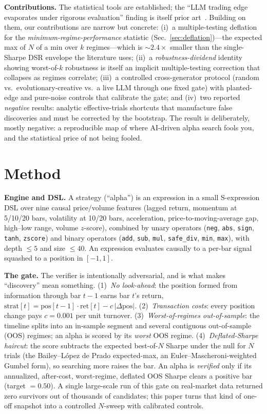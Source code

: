 \documentclass[sigconf,review,anonymous]{acmart}
\begin{document}
\textbf{Contributions.} The statistical tools are established; the ``LLM trading edge evaporates under rigorous evaluation'' finding is itself prior art~\cite{finsaber2026}. Building on them, our contributions are narrow but concrete: (i)~a multiple-testing deflation for the \emph{minimum-regime-performance} statistic (Sec.~\ref{sec:deflation})---the expected max of $N$ of a min over $k$ regimes---which is ${\sim}2.4\times$ smaller than the single-Sharpe DSR envelope the literature uses; (ii)~a \emph{robustness-dividend} identity showing worst-of-$k$ robustness is itself an implicit multiple-testing correction that collapses as regimes correlate; (iii)~a controlled cross-generator protocol (random vs.\ evolutionary-creative vs.\ a live LLM through one fixed gate) with planted-edge and pure-noise controls that calibrate the gate; and (iv)~two reported \emph{negative} results: analytic effective-trials shortcuts that manufacture false discoveries and must be corrected by the bootstrap. The result is deliberately, mostly negative: a reproducible map of where AI-driven alpha search fools you, and the statistical price of not being fooled.

\section{Method}
\textbf{Engine and DSL.} A strategy (``alpha'') is an expression in a small S-expression DSL over nine causal price/volume features (lagged return, momentum at 5/10/20 bars, volatility at 10/20 bars, acceleration, price-to-moving-average gap, high--low range, volume $z$-score), combined by unary operators (\texttt{neg}, \texttt{abs}, \texttt{sign}, \texttt{tanh}, \texttt{zscore}) and binary operators (\texttt{add}, \texttt{sub}, \texttt{mul}, \texttt{safe\_div}, \texttt{min}, \texttt{max}), with depth $\le 5$ and size $\le 40$. An expression evaluates causally to a per-bar signal squashed to a position in $[-1,1]$.

\textbf{The gate.} The verifier is intentionally adversarial, and is what makes ``discovery'' mean something. (1)~\emph{No look-ahead}: the position formed from information through bar $t{-}1$ earns bar $t$'s return, $\text{strat}[t]=\text{pos}[t{-}1]\cdot\text{ret}[t]-c\,|\Delta\text{pos}|$. (2)~\emph{Transaction costs}: every position change pays $c=0.001$ per unit turnover. (3)~\emph{Worst-of-regimes out-of-sample}: the timeline splits into an in-sample segment and several contiguous out-of-sample (OOS) regimes; an alpha is scored by its \emph{worst} OOS regime. (4)~\emph{Deflated-Sharpe haircut}: the score subtracts the expected best-of-$N$ Sharpe under the null for $N$ trials (the Bailey--L\'opez de Prado expected-max, an Euler--Mascheroni-weighted Gumbel form), so searching more raises the bar. An alpha is \emph{verified} only if its annualized, after-cost, worst-regime, deflated OOS Sharpe clears a positive bar (target $=0.50$). A single large-scale run of this gate on real-market data returned zero survivors out of thousands of candidates; this paper turns that kind of one-off snapshot into a controlled $N$-sweep with calibrated controls.
\end{document}
